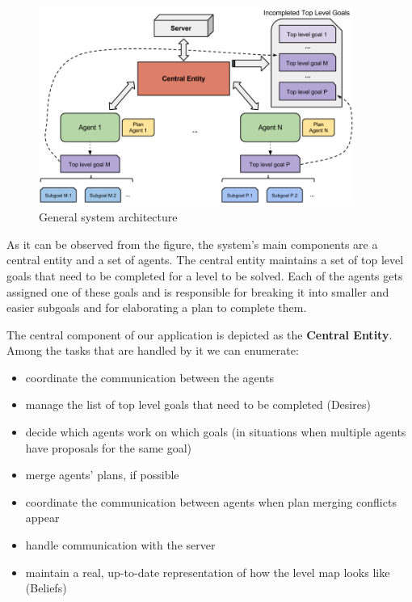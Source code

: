 \begin{figure}[htb]
\begin{center}
 \includegraphics[width=0.92\textwidth]{figures/architecture.png}
 \caption{General system architecture}
 \label{fig:architecture}
\end{center}
\end{figure}

As it can be observed from the figure, the system's main components are a central entity and a set of agents.
The central entity maintains a set of top level goals that need to be completed for a level to be solved. Each
of the agents gets assigned one of these goals and is responsible for breaking it into smaller and easier
subgoals and for elaborating a plan to complete them.

The central component of our application is depicted as the \textbf{Central Entity}. Among the tasks that are
handled by it we can enumerate:

\vspace{-12pt}
\begin{itemize}
\setlength{\itemsep}{0cm}
\item coordinate the communication between the agents
\item manage the list of top level goals that need to be completed (Desires)
\item decide which agents work on which goals (in situations when multiple agents have proposals for the same goal)
\item merge agents' plans, if possible
\item coordinate the communication between agents when plan merging conflicts appear
\item handle communication with the server
\item maintain a real, up-to-date representation of how the level map looks like (Beliefs)
\end{itemize}
\vspace{-0.3cm}

